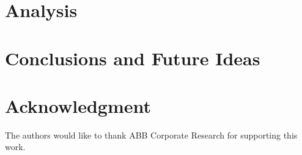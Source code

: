 \documentclass[conference]{IEEEtran}
\begin{document}
\section{Analysis}
\label{sec:AnalysisResults}


\section{Conclusions and Future Ideas}

\vspace*{-4mm}
\section*{Acknowledgment}
The authors would like to thank ABB Corporate Research for supporting this work.



\end{document}

